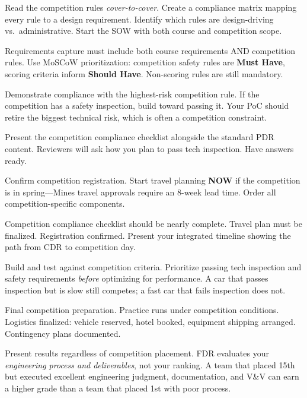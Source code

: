 \begin{description}[leftmargin=1.5em,style=nextline]
\item[Sprint 0--1:] Read the competition rules \emph{cover-to-cover}. Create a compliance matrix mapping every rule to a design requirement. Identify which rules are design-driving vs.\ administrative. Start the SOW with both course and competition scope.

\item[Sprint 2--3:] Requirements capture must include both course requirements AND competition rules. Use MoSCoW prioritization: competition safety rules are \textbf{Must Have}, scoring criteria inform \textbf{Should Have}. Non-scoring rules are still mandatory.

\item[Sprint 4 (PoC):] Demonstrate compliance with the highest-risk competition rule. If the competition has a safety inspection, build toward passing it. Your PoC should retire the biggest technical risk, which is often a competition constraint.

\item[Sprint 5 (PDR):] Present the competition compliance checklist alongside the standard PDR content. Reviewers will ask how you plan to pass tech inspection. Have answers ready.

\item[Sprint 6:] Confirm competition registration. Start travel planning \textbf{NOW} if the competition is in spring---Mines travel approvals require an 8-week lead time. Order all competition-specific components.

\item[Sprint 7--8 (CDR):] Competition compliance checklist should be nearly complete. Travel plan must be finalized. Registration confirmed. Present your integrated timeline showing the path from CDR to competition day.

\item[Sprints 9--11:] Build and test against competition criteria. Prioritize passing tech inspection and safety requirements \emph{before} optimizing for performance. A car that passes inspection but is slow still competes; a fast car that fails inspection does not.

\item[Sprint 12--13:] Final competition preparation. Practice runs under competition conditions. Logistics finalized: vehicle reserved, hotel booked, equipment shipping arranged. Contingency plans documented.

\item[Sprint 14 (FDR):] Present results regardless of competition placement. FDR evaluates your \emph{engineering process and deliverables}, not your ranking. A team that placed 15th but executed excellent engineering judgment, documentation, and V\&V can earn a higher grade than a team that placed 1st with poor process.
\end{description}

